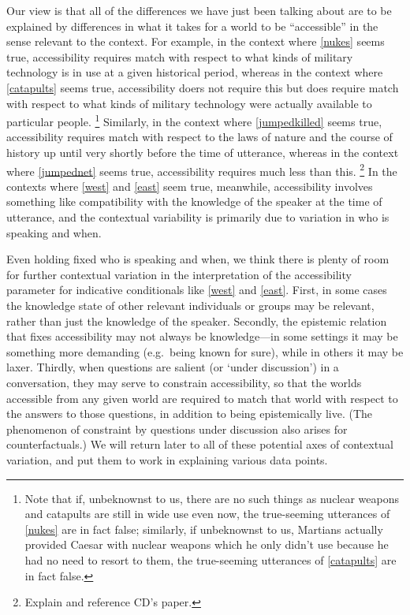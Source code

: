 \documentclass[If.tex]{subfiles}
\begin{document}
Our view is that all of the differences we have just been talking about are to be explained by differences in what it takes for a world to be “accessible” in the sense relevant to the context. For example, in the context where \ref{nukes} seems true, accessibility requires match with respect to what kinds of military technology is in use at a given historical period, whereas in the context where \ref{catapults} seems true, accessibility doers not require this but does require match with respect to what kinds of military technology were actually available to particular people.%
\footnote{Note that if, unbeknownst to us, there are no such things as nuclear weapons and catapults are still in wide use even now, the true-seeming utterances of \ref{nukes} are in fact false; similarly, if unbeknownst to us, Martians actually provided Caesar with nuclear weapons which he only didn't use because he had no need to resort to them, the true-seeming utterances of \ref{catapults} are in fact false.}
 Similarly, in the context where \ref{jumpedkilled} seems true, accessibility requires match with respect to the laws of nature and the course of history up until very shortly before the time of utterance, whereas in the context where \ref{jumpednet} seems true, accessibility requires much less than this.%
\footnote{Explain and reference CD's paper.}
 In the contexts where \ref{west} and \ref{east} seem true, meanwhile, accessibility involves something like compatibility with the knowledge of the speaker at the time of utterance, and the contextual variability is primarily due to variation in who is speaking and when.

Even holding fixed who is speaking and when, we think there is plenty of room for further contextual variation in the interpretation of the accessibility parameter for indicative conditionals like \ref{west} and \ref{east}.  First, in some cases the knowledge state of other relevant individuals or groups may be relevant, rather than just the knowledge of the speaker.  Secondly, the epistemic relation that fixes accessibility may not always be knowledge---in some settings it may be something more demanding (e.g.\ being known for sure), while in others it may be laxer.   Thirdly, when questions are salient (or ‘under discussion’) in a conversation, they may serve to constrain accessibility, so that the worlds accessible from any given world are required to match that world with respect to the answers to those questions, in addition to being epistemically live.  (The phenomenon of constraint by questions under discussion also arises for counterfactuals.)  We will return later to all of these potential axes of contextual variation, and put them to work in explaining various data points.  
\end{document}
